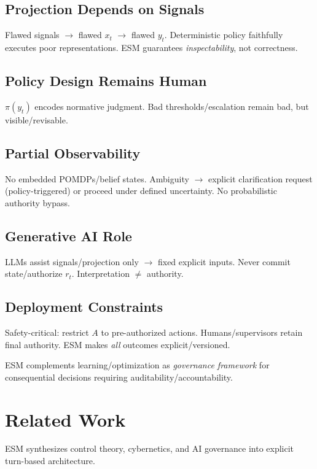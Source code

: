 \documentclass[11pt]{article}
\begin{document}
\subsection{Projection Depends on Signals}
Flawed signals $\to$ flawed $x_t$ $\to$ flawed $y_t$. Deterministic policy faithfully executes poor representations. ESM guarantees \emph{inspectability}, not correctness.

\subsection{Policy Design Remains Human}
$\pi(y_t)$ encodes normative judgment. Bad thresholds/escalation remain bad, but visible/revisable.

\subsection{Partial Observability}
No embedded POMDPs/belief states. Ambiguity $\to$ explicit clarification request (policy-triggered) or proceed under defined uncertainty. No probabilistic authority bypass.

\subsection{Generative AI Role}
LLMs assist signals/projection only $\to$ fixed explicit inputs. Never commit state/authorize $r_t$. Interpretation $\neq$ authority.

\subsection{Deployment Constraints}
Safety-critical: restrict $A$ to pre-authorized actions. Humans/supervisors retain final authority. ESM makes \emph{all} outcomes explicit/versioned.

ESM complements learning/optimization as \emph{governance framework} for consequential decisions requiring auditability/accountability.



\section{Related Work}
\label{sec:related_work}

ESM synthesizes control theory, cybernetics, and AI governance into explicit turn-based architecture.
\end{document}

